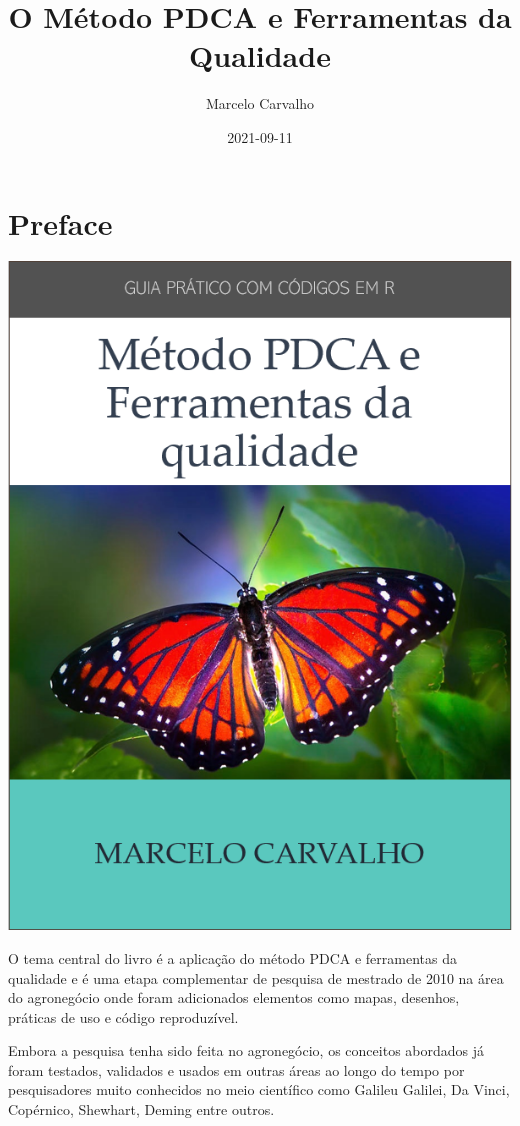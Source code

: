 \documentclass[
]{article}
\title{O Método PDCA e Ferramentas da Qualidade}
\author{Marcelo Carvalho}
\date{2021-09-11}
\begin{document}
\maketitle

{
\setcounter{tocdepth}{2}
\tableofcontents
}
\hypertarget{preface}{%
\section*{Preface}\label{preface}}

\includegraphics{images/pdca_capa.png}

O tema central do livro é a aplicação do método PDCA e ferramentas da qualidade e é uma etapa complementar de pesquisa de mestrado de 2010 na área do agronegócio onde foram adicionados elementos como mapas, desenhos, práticas de uso e código reproduzível.

Embora a pesquisa tenha sido feita no agronegócio, os conceitos abordados já foram testados, validados e usados em outras áreas ao longo do tempo por pesquisadores muito conhecidos no meio científico como Galileu Galilei, Da Vinci, Copérnico, Shewhart, Deming entre outros.
\end{document}
